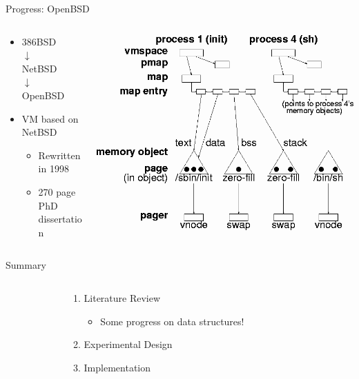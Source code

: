 \documentclass[aspectratio=169]{beamer}
\newcommand{\bi}{\begin{itemize}}
\newcommand{\ei}{\end{itemize}}
\newcommand{\bn}{\begin{enumerate}}
\newcommand{\en}{\end{enumerate}}
\begin{document}
\begin{frame}{Progress: OpenBSD}
  \begin{columns}[T]
    \begin{column}{0.4\textwidth}
      \bi
    \item 386BSD\\$\downarrow$\\NetBSD\\$\downarrow$\\OpenBSD
      \pause
    \item VM based on NetBSD
      \pause
      \bi
    \item Rewritten in 1998
      \pause
    \item 270 page PhD dissertation
      \pause
      \ei
      \ei
    \end{column}
    \begin{column}{0.6\textwidth}
      \includegraphics[scale=0.35]{./figures/uvm.png}
    \end{column}
  \end{columns}
\end{frame}

\begin{frame}{Summary}
  \begin{columns}[T]
    \begin{column}{0.2\textwidth}
    \end{column}
    \begin{column}{0.6\textwidth}
      \bn
    \item Literature Review
      \bi
    \item Some progress on data structures!
      \ei
    \item Experimental Design
    \item Implementation
      \en
    \end{column}
    \begin{column}{0.2\textwidth}
    \end{column}
  \end{columns}
\end{frame}
\end{document}
